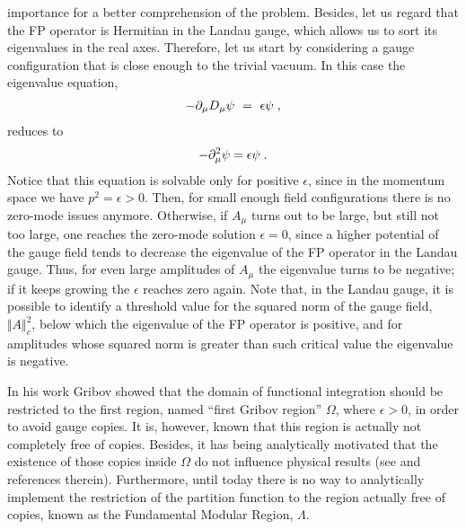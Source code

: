 importance for a better comprehension of the problem. Besides, let us regard that the FP
operator is Hermitian in the Landau gauge, which allows us to sort its eigenvalues in the real
axes. Therefore, let us start by considering a gauge configuration that is close enough to the
trivial vacuum. In this case the eigenvalue equation,
\begin{eqnarray}
- \partial_\mu D_\mu \psi ~=~ \epsilon \psi\;,
\end{eqnarray}
reduces to
\begin{equation}
-\partial_\mu^2 \psi = \epsilon \psi \;.
\end{equation}
Notice that this equation is solvable only for positive $\epsilon$, since in the momentum space
we have $p^{2} = \epsilon >0$. Then, for small enough field configurations there is no
zero-mode issues anymore. Otherwise, if $A_{\mu}$ turns out to be large, but still not too
large, one reaches the zero-mode solution $\epsilon = 0$, since a higher potential of the gauge
field tends to decrease the eigenvalue of the FP operator in the Landau gauge. Thus, for even
large amplitudes of $A_{\mu}$ the eigenvalue turns to be negative; if it keeps growing the
$\epsilon$ reaches zero again. Note that, in the Landau gauge, it is possible to identify a
threshold value for the squared norm of the gauge field, $\Vert A \Vert^{2}_{c}$, below
which the eigenvalue of the FP operator is positive, and for amplitudes whose squared norm
is greater than such critical value the eigenvalue is negative.

In his work \cite{Gribov:1977wm} Gribov showed that the domain of functional integration should
be restricted to the first region, named ``first Gribov region'' $\Omega$, where $\epsilon >0$,
in order to avoid gauge copies. It is, however, known that this region is actually not
completely free of copies. Besides, it has being analytically motivated that the existence of
those copies inside $\Omega$ do not influence physical results (see \cite{Dudal:2014rxa} and
references therein). Furthermore, until today there is no way to analytically implement the
restriction of the partition function to the region actually free of copies, known as the
Fundamental Modular Region, $\Lambda$.

